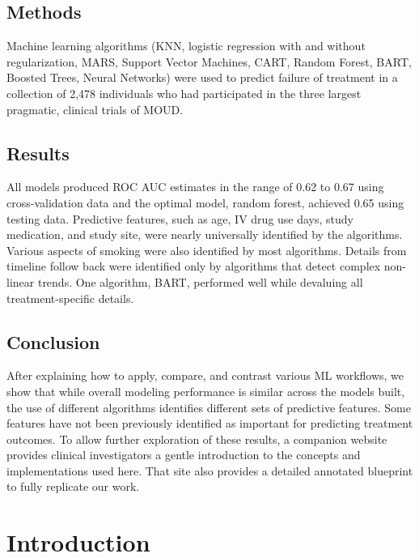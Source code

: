 \documentclass[
  number,
  preprint,
  3p,
  onecolumn]{elsarticle}
\begin{document}
\subsection{Methods}\label{methods}

Machine learning algorithms (KNN, logistic regression with and without
regularization, MARS, Support Vector Machines, CART, Random Forest,
BART, Boosted Trees, Neural Networks) were used to predict failure of
treatment in a collection of 2,478 individuals who had participated in
the three largest pragmatic, clinical trials of MOUD.

\subsection{Results}\label{results}

All models produced ROC AUC estimates in the range of 0.62 to 0.67 using
cross-validation data and the optimal model, random forest, achieved
0.65 using testing data. Predictive features, such as age, IV drug use
days, study medication, and study site, were nearly universally
identified by the algorithms. Various aspects of smoking were also
identified by most algorithms. Details from timeline follow back were
identified only by algorithms that detect complex non-linear trends. One
algorithm, BART, performed well while devaluing all treatment-specific
details.

\subsection{Conclusion}\label{conclusion}

After explaining how to apply, compare, and contrast various ML
workflows, we show that while overall modeling performance is similar
across the models built, the use of different algorithms identifies
different sets of predictive features. Some features have not been
previously identified as important for predicting treatment outcomes. To
allow further exploration of these results, a companion website provides
clinical investigators a gentle introduction to the concepts and
implementations used here. That site also provides a detailed annotated
blueprint to fully replicate our work.

\section{Introduction}\label{introduction}
\end{document}

